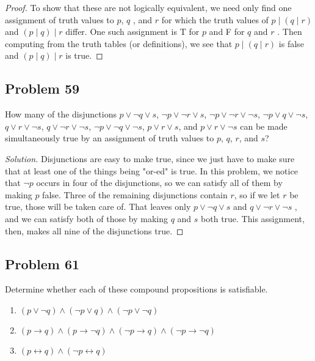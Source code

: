 \documentclass{article}
\newenvironment{solution}{\renewcommand\qedsymbol{}\begin{proof}[Solution]}{\end{proof}}
\begin{document}
\begin{proof}
To show that these are not logically equivalent, we need only find one assignment of truth values to $p$, $q$ , and $r$ for which the truth values of $p \mid (q \mid r)$ and $(p \mid q) \mid r$ differ. One such assignment is T for $p$ and F for $q$ and $r$ . Then computing from the truth tables (or definitions), we see that $p \mid (q \mid r)$ is false and $(p \mid q) \mid r$ is true.
\end{proof}

\clearpage
\subsection*{Problem 59}
How many of the disjunctions $p \lor \neg q \lor s$, $\neg p \lor \neg r \lor s$, $\neg p \lor \neg r \lor \neg s$, $\neg p \lor q \lor \neg s$, $q \lor r \lor \neg s$, $q \lor \neg r \lor \neg s$, $\neg p \lor \neg q \lor \neg s$, $p \lor r \lor s$, and $p \lor r \lor\neg s$ can be made simultaneously true by an assignment of truth values to $p$, $q$, $r$, and $s$?

\begin{solution}
Disjunctions are easy to make true, since we just have to make sure that at least one of the things being "or-ed" is true. In this problem, we notice that $\neg p$ occurs in four of the disjunctions, so we can satisfy all of them by making $p$ false. Three of the remaining disjunctions contain $r$, so if we let $r$ be true, those will be taken care of. That leaves only $p \lor \neg q \lor s$ and $q \lor \neg r \lor \neg s$ , and we can satisfy both of those by making $q$ and $s$ both true. This assignment, then, makes all nine of the disjunctions true.
\end{solution}
\subsection*{Problem 61}
Determine whether each of these compound propositions is satisfiable.
\begin{enumerate}[leftmargin=16pt, topsep = 8pt]
\item $(p \lor \neg q) \land (\neg p \lor q) \land (\neg p \lor \neg q)$
\item $(p \rightarrow q) \land (p \rightarrow \neg q) \land (\neg p \rightarrow q) \land (\neg p \rightarrow \neg q)$
\item $(p \leftrightarrow q) \land (\neg p \leftrightarrow q)$
\end{enumerate}
\end{document}
